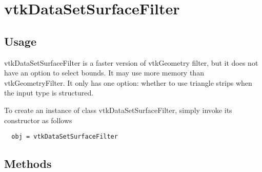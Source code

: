 \section{vtkDataSetSurfaceFilter}

\subsection{Usage}

 vtkDataSetSurfaceFilter is a faster version of vtkGeometry filter, but it 
 does not have an option to select bounds.  It may use more memory than
 vtkGeometryFilter.  It only has one option: whether to use triangle strips 
 when the input type is structured.

To create an instance of class vtkDataSetSurfaceFilter, simply
invoke its constructor as follows
\begin{verbatim}
  obj = vtkDataSetSurfaceFilter
\end{verbatim}
\subsection{Methods}

